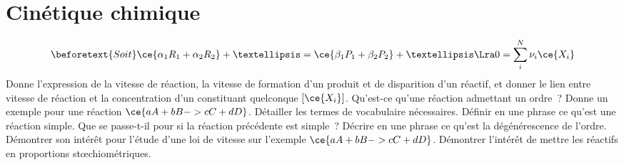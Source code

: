 \documentclass[a4paper, 10pt, final, garamond]{book}
\begin{document}
\setcounter{chapter}{8}

\chapter{Cinétique chimique }

\begin{enumerate}[label=\sqenumi, leftmargin=10pt]
	\leavevmode\vspace*{-\dimexpr\baselineskip+\abovedisplayskip\relax-10pt}
	\begin{gather*}
		\beforetext{Soit}
		\ce{\alpha_1R_1 + \alpha_2R_2} +…
		=
		\ce{\beta_1P_1 +\beta_2P_2}+…
		\Lra
		0 = \sum_{i}^{N}\nu_i \ce{X_i}
	\end{gather*}
	Donne l'expression de la vitesse de réaction, la vitesse de formation d'un
	produit et de disparition d'un réactif, et donner le lien entre vitesse de
	réaction et la concentration d'un constituant quelconque $[\ce{X_i}]$.
	\smallbreak
	\vspace{-15pt}
	Qu'est-ce qu'une réaction admettant un ordre~? Donne un exemple pour une
	réaction $\ce{aA + bB -> cC + dD}$. Détailler les termes de vocabulaire
	nécessaires. Définir en une phrase ce qu'est une réaction simple. Que se
	passe-t-il pour si la réaction précédente est simple~?
	\smallbreak
	Décrire en une phrase ce qu'est la dégénérescence de l'ordre. Démontrer son
	intérêt pour l'étude d'une loi de vitesse sur l'exemple $\ce{aA + bB -> cC +
			dD}$. Démontrer l'intérêt de mettre les réactifs en proportions
	stœchiométriques.
	\smallbreak
\end{enumerate}
\end{document}
